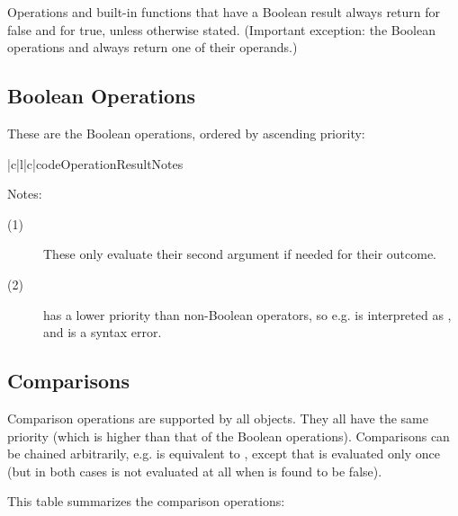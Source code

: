 Operations and built-in functions that have a Boolean result always
return  for false and  for true, unless otherwise
stated.  (Important exception: the Boolean operations  and
 always return one of their operands.)

\subsection{Boolean Operations}

These are the Boolean operations, ordered by ascending priority:

\begin{tableiii}{|c|l|c|}{code}{Operation}{Result}{Notes}
  \hline
  \hline
\end{tableiii}

\noindent
Notes:

\begin{description}

\item[(1)]
These only evaluate their second argument if needed for their outcome.

\item[(2)]
 has a lower priority than non-Boolean operators, so e.g.
 is interpreted as , and
 is a syntax error.

\end{description}

\subsection{Comparisons}

Comparison operations are supported by all objects.  They all have the
same priority (which is higher than that of the Boolean operations).
Comparisons can be chained arbitrarily, e.g.  is
equivalent to , except that  is
evaluated only once (but in both cases  is not evaluated at
all when  is found to be false).

This table summarizes the comparison operations:

